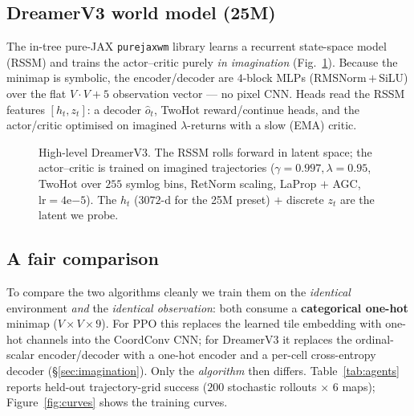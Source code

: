 \documentclass[11pt]{article}
\newcommand{\code}[1]{\texttt{#1}}
\begin{document}
\subsection{DreamerV3 world model (25M)}
The in-tree pure-JAX \code{purejaxwm} library learns a recurrent state-space model
(RSSM) and trains the actor--critic purely \emph{in imagination}
(Fig.~\ref{fig:dreamer}). Because the minimap is symbolic, the encoder/decoder are
$4$-block MLPs (RMSNorm\,$+$\,SiLU) over the flat $V{\cdot}V+5$ observation vector
--- no pixel CNN. Heads read the RSSM features $[h_t,z_t]$: a decoder
$\hat o_t$, TwoHot reward/continue heads, and the actor/critic optimised on imagined
$\lambda$-returns with a slow (EMA) critic.

\begin{figure}[H]
\centering
{}
\caption{High-level DreamerV3. The RSSM rolls forward in latent space; the
actor--critic is trained on imagined trajectories ($\gamma{=}0.997,\lambda{=}0.95$,
TwoHot over $255$ symlog bins, RetNorm scaling, LaProp $+$ AGC, $\text{lr}=4\mathrm{e}{-5}$).
The $h_t$ ($3072$-d for the 25M preset) $+$ discrete $z_t$ are the latent we probe.}
\label{fig:dreamer}
\end{figure}

\subsection{A fair comparison}\label{sec:fair}
To compare the two algorithms cleanly we train them on the \emph{identical}
environment \emph{and} the \emph{identical observation}: both consume a
\textbf{categorical one-hot} minimap ($V{\times}V{\times}9$). For PPO this replaces
the learned tile embedding with one-hot channels into the CoordConv CNN; for
DreamerV3 it replaces the ordinal-scalar encoder/decoder with a one-hot encoder
and a per-cell cross-entropy decoder (\S\ref{sec:imagination}). Only the
\emph{algorithm} then differs. Table~\ref{tab:agents} reports held-out
trajectory-grid success ($200$ stochastic rollouts $\times$ 6 maps);
Figure~\ref{fig:curves} shows the training curves.
\end{document}
